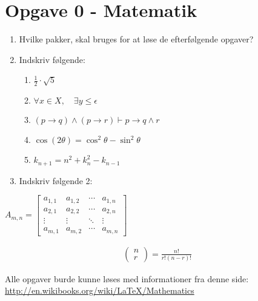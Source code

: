 \documentclass[12pt]{article}
\begin{document}
\section{Opgave 0 - Matematik}
	\begin{enumerate}
  		\item Hvilke pakker, skal bruges for at løse de efterfølgende opgaver?
  		\item Indskriv følgende:
			\begin{enumerate}				
				\item $\frac{1}{2} \cdot \sqrt{5}$
				\item $\forall x \in X, \quad \exists y \leq \epsilon$
				\item $(p \rightarrow q) \wedge (p \rightarrow r) \vdash p \rightarrow q \wedge r$
				\item $\cos (2\theta) = \cos^2 \theta - \sin^2 \theta$
				\item $k_{n+1} = n^2 + k_n^2 - k_{n-1}$
			\end{enumerate}
 		\item Indskriv følgende 2:
	\end{enumerate}
\begin{center}
	$A_{m,n} =
 	\begin{bmatrix}
  		a_{1,1} & a_{1,2} & \cdots & a_{1,n} \\
  		a_{2,1} & a_{2,2} & \cdots & a_{2,n} \\
  		\vdots  & \vdots  & \ddots & \vdots  \\
  		a_{m,1} & a_{m,2} & \cdots & a_{m,n}
 	\end{bmatrix}$
\end{center}

\begin{align}
\left(\!
    \begin{array}{c}
      n \\
      r
    \end{array}
  \!\right) = \frac{n!}{r!(n-r)!}
\end{align}

Alle opgaver burde kunne løses med informationer fra denne side:\\
\url{http://en.wikibooks.org/wiki/LaTeX/Mathematics}
\end{document}
